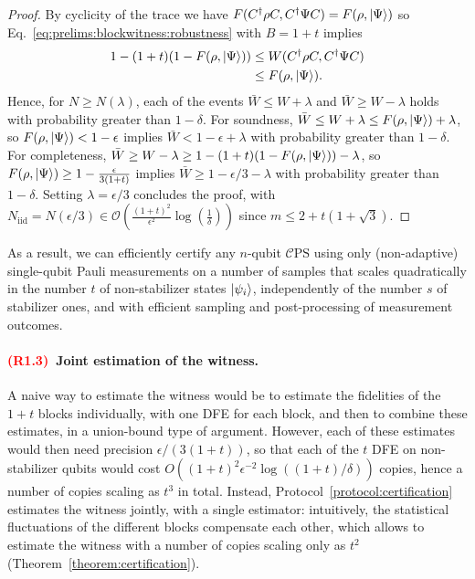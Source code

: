 \documentclass[a4paper,twocolumn,11pt,unpublished]{quantumarticle}
\newcommand{\Niid}{N_{\mathrm{iid}}}
\newcommand{\mCEPS}{\mathcal{C}\text{PS}}
\newif\ifhighlightchanges \highlightchangestrue
\newcommand{\revother}[1]{\ifhighlightchanges{\color{red}#1}\else#1\fi}
\newcommand{\revtag}[1]{\ifhighlightchanges\textcolor{red}{\textbf{(#1)}}\ \fi}
\begin{document}
\begin{proof}
        By cyclicity of the trace we have $F(C^\dagger\rho C,C^\dagger\Psi C)=F(\rho,\ket\Psi)$ so Eq.~\eqref{eq:prelims:blockwitness:robustness} with $B=1+t$ implies
        \begin{equation}
            \begin{aligned}
            1-(1+t)(1-F(\rho,\ket\Psi)) &\leq W(C^\dagger\rho C,C^\dagger\Psi C)\\
            &\leq F(\rho,\ket\Psi).
            \end{aligned}
        \end{equation}
        Hence, for $N\ge N(\lambda)$, each of the events $\bar W \leq W + \lambda$ and $\bar W \geq W - \lambda$ holds with probability greater than $1-\delta$. For soundness, $\bar W \leq W+\lambda \leq F(\rho,\ket\Psi)+\lambda$, so $F(\rho,\ket\Psi)<1-\epsilon$ implies $\bar W<1-\epsilon+\lambda$ with probability greater than $1-\delta$. For completeness, $\bar W \geq W-\lambda \geq 1-(1+t)(1-F(\rho,\ket\Psi))-\lambda$, so $F(\rho,\ket\Psi)\ge1-\frac\epsilon{3(1+t)}$ implies $\bar W\ge1-\epsilon/3-\lambda$ with probability greater than $1-\delta$. Setting $\lambda=\epsilon/3$ concludes the proof, with $\Niid=N(\epsilon/3)\in\mathcal O(\frac{(1+t)^2}{\epsilon^2}\log(\frac{1}{\delta}))$ since $m\le 2+t(1+\sqrt3)$.
        \end{proof}
        As a result, we can efficiently certify any $n$-qubit $\mCEPS$ using only (non-adaptive) single-qubit Pauli measurements on a number of samples that scales quadratically in the number $t$ of non-stabilizer states $\ket{\psi_i}$, independently of the number $s$ of stabilizer ones, and with efficient sampling and post-processing of measurement outcomes.

        \revother{\paragraph{\revtag{R1.3}Joint estimation of the witness.}
        A naive way to estimate the witness would be to estimate the fidelities of the $1+t$ blocks individually, with one DFE for each block, and then to combine these estimates, in a union-bound type of argument. However, each of these estimates would then need precision $\epsilon/(3(1+t))$, so that each of the $t$ DFE on non-stabilizer qubits would cost $O((1+t)^2\epsilon^{-2}\log((1+t)/\delta))$ copies, hence a number of copies scaling as $t^3$ in total. Instead, Protocol~\ref{protocol:certification} estimates the witness jointly, with a single estimator: intuitively, the statistical fluctuations of the different blocks compensate each other, which allows to estimate the witness with a number of copies scaling only as $t^2$ (Theorem~\ref{theorem:certification}).}
\end{document}
